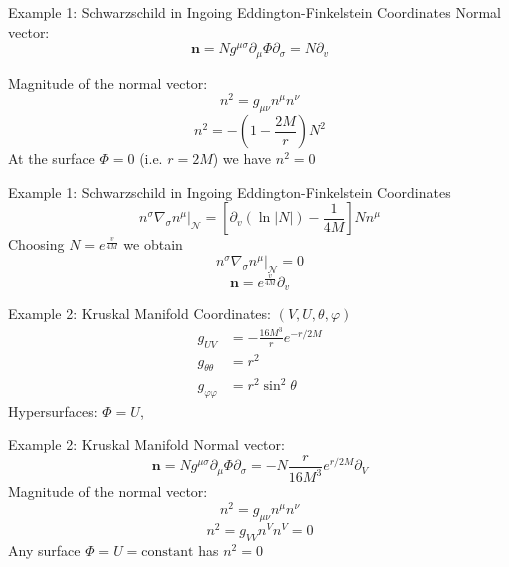 \documentclass{beamer}
\begin{document}
        \begin{frame}{Example 1: Schwarzschild in Ingoing Eddington-Finkelstein Coordinates}
        	Normal vector:
            \pause
        	$$ \mathbf{n} = N g^{\mu\sigma} \partial_{\mu}\Phi\partial_{\sigma} = 
            N\partial_{v}$$

			Magnitude of the normal vector:
            \pause
           	$$ n^{2} = g_{\mu\nu}n^{\mu}n^{\nu}$$
 			$$ n^{2} = -\left(1-\frac{2M}{r}\right)N^{2}$$
            \pause
            At the surface $\Phi = 0$ (i.e. $r = 2M$) we have $ n^{2} = 0 $
        \end{frame}
        
        \begin{frame}{Example 1: Schwarzschild in Ingoing Eddington-Finkelstein Coordinates}
        	$$\left.n^{\sigma}\nabla_{\sigma}n^{\mu}\right|_{\mathcal{N}}  =  
            \left[\partial_{v}\left(\ln\left|N\right|\right)-\frac{1}{4M}\right]Nn^{\mu}$$
            \pause
			Choosing $N = e^{\frac{v}{4M}}$ we obtain
            \pause
            $$\left.n^{\sigma}\nabla_{\sigma}n^{\mu}\right|_{\mathcal{N}}  = 0 $$
            \pause
            $$ \mathbf{n} = e^{\frac{v}{4M}} \partial_{v}$$
        \end{frame}
        
        \begin{frame}{Example 2: Kruskal Manifold}
           	Coordinates: $\left(V,U,\theta,\varphi\right)$ 
            \pause
            \begin{align*}
                g_{UV} &= -\frac{16M^{3}}{r}e^{-r/2M}\\
				g_{\theta\theta} &= r^{2}\\
				g_{\varphi\varphi} &= r^{2}\sin^{2}\theta
            \end{align*}
            \pause
            Hypersurfaces: $\Phi=U$,
        \end{frame}
        
        \begin{frame}{Example 2: Kruskal Manifold}
        	Normal vector:
            \pause
        	$$ \mathbf{n} = N g^{\mu\sigma} \partial_{\mu}\Phi\partial_{\sigma} = 
            -N\frac{r}{16M^{3}}e^{r/2M}\partial_{V}$$
            \pause
			Magnitude of the normal vector:
            \pause
           	$$ n^{2} = g_{\mu\nu}n^{\mu}n^{\nu}$$
 			$$ n^{2} = g_{VV}n^{V}n^{V}=0$$
            \pause
            Any surface $\Phi = U = \textrm{constant}$ has $ n^{2} = 0 $
        \end{frame}
        
\end{document}
